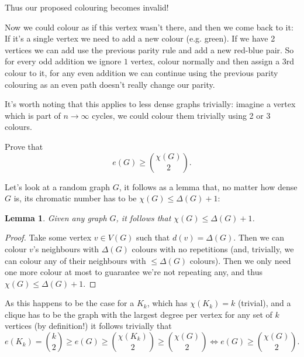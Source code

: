 \documentclass[english]{IMTexam}
\newtheorem{lemma}{Lemma}
\begin{document}
\begin{questions}
\begin{solution}
			Thus our proposed colouring becomes invalid!
			
			Now we could colour as if this vertex wasn't there, and then we come back to it:
			If it's a single vertex we need to add a new colour (e.g. green). If we have 2 vertices we can add use the previous parity rule and add a new red-blue pair.
			So for every odd addition we ignore $ 1 $ vertex, colour normally and then assign a 3rd colour to it, for any even addition we can continue using the previous parity colouring as an even path doesn't really change our parity.
			
			It's worth noting that this applies to less dense graphs trivially: imagine a vertex which is part of $ n\to\infty $ cycles, we could colour them trivially using 2 or 3 colours.
			
			
			\hfill\qedsymbol
		\end{solution}
		
		\question Prove that
		\[ e(G)\geqslant \binom{\chi(G)}{2}. \]
		
		\begin{solution}

			Let's look at a random graph $ G $, it follows as a lemma that, no matter how dense $ G $ is, its chromatic number has to be $ \chi(G)\leqslant\Delta(G)+1 $:
			
			\begin{lemma}\label{lem:maxD}
				Given any graph $ G $, it follows that $ \chi(G)\leqslant\Delta(G)+1 $.
			\end{lemma}
		
			\begin{proof}
				Take some vertex $ v\in V(G) $ such that $ d(v)=\Delta(G) $. Then we can colour $ v $'s neighbours with $ \Delta(G) $ colours with no repetitions (and, trivially, we can colour any of their neighbours with $ \leqslant\Delta(G) $ colours). Then we only need one more colour at most to guarantee we're not repeating any, and thus
				$ \chi(G)\leqslant\Delta(G)+1 $.
			\end{proof}
			
			As this happens to be the case for a $ K_k $, which has $ \chi(K_k)=k $ (trivial), and a clique has to be the graph with the largest degree per vertex for any set of $ k $ vertices (by definition!) it follows trivially that
			\[ e(K_k)=\binom{k}{2}\geqslant e(G)\geqslant \binom{\chi(K_k)}{2}\geqslant \binom{\chi(G)}{2}\iff e(G)\geqslant \binom{\chi(G)}{2}. \]
			

\end{solution}
\end{questions}
\end{document}
